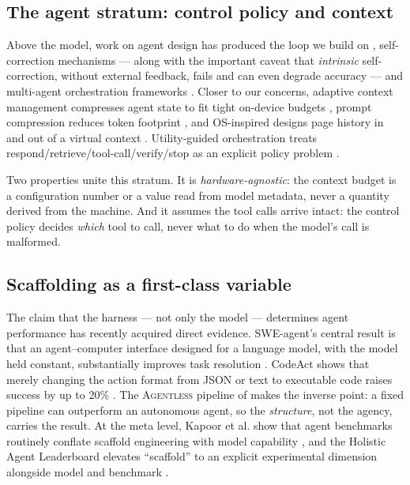 \documentclass[11pt,a4paper]{article}
\begin{document}
\subsection{The agent stratum: control policy and context}

Above the model, work on agent design has produced the loop we build on
\citep{yao2023react}, self-correction mechanisms
\citep{shinn2023reflexion,madaan2023selfrefine} --- along with the important
caveat that \emph{intrinsic} self-correction, without external feedback, fails
and can even degrade accuracy \citep{huang2024llmscannot} --- and multi-agent
orchestration frameworks \citep{wu2024autogen,hong2024metagpt}. Closer to our
concerns, adaptive context management compresses agent state to fit tight
on-device budgets \citep{vijayvargiya2025adaptive}, prompt compression reduces
token footprint \citep{jiang2023llmlingua}, and OS-inspired designs page history
in and out of a virtual context \citep{packer2023memgpt}. Utility-guided
orchestration treats respond/retrieve/tool-call/verify/stop as an explicit policy
problem \citep{liu2026utility}.

Two properties unite this stratum. It is \emph{hardware-agnostic}: the context
budget is a configuration number or a value read from model metadata, never a
quantity derived from the machine. And it assumes the tool calls arrive intact:
the control policy decides \emph{which} tool to call, never what to do when the
model's call is malformed.

\subsection{Scaffolding as a first-class variable}

The claim that the harness --- not only the model --- determines agent
performance has recently acquired direct evidence. SWE-agent's central result is
that an agent--computer interface designed for a language model, with the model
held constant, substantially improves task resolution
\citep{yang2024sweagent}. CodeAct shows that merely changing the action format
from JSON or text to executable code raises success by up to 20\%
\citep{wang2024codeact}. The \textsc{Agentless} pipeline of
\citet{xia2025demystifying} makes the inverse point: a fixed pipeline can
outperform an autonomous agent, so the \emph{structure}, not the agency, carries
the result. At the meta level, Kapoor et al. show that
agent benchmarks routinely conflate scaffold engineering with model capability
\citep{kapoor2025aiagents}, and the Holistic Agent Leaderboard elevates
``scaffold'' to an explicit experimental dimension alongside model and benchmark
\citep{kapoor2025hal}.
\end{document}
